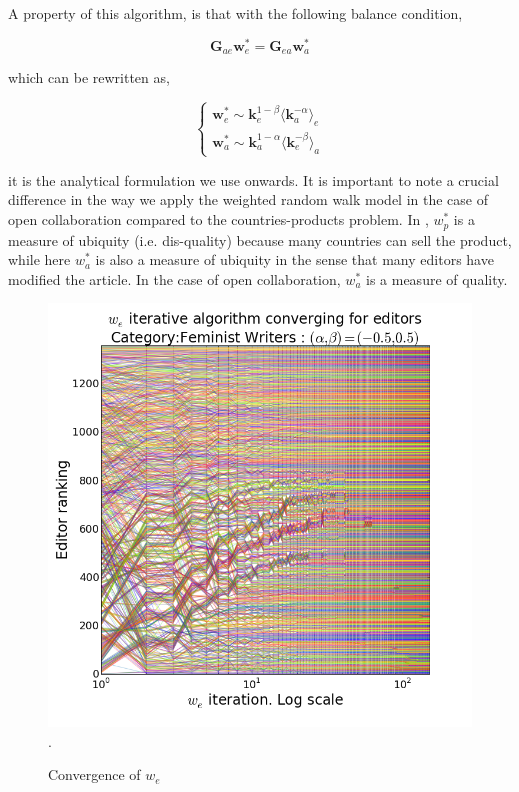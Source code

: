A property of this algorithm, is that with the following balance condition,

\begin{equation}
\mathbf{G}_{ae} \mathbf{w}^*_e = \mathbf{G}_{ea} \mathbf{w}^*_a
\end{equation}

which can be rewritten as,

\begin{equation}
\begin{cases}
\mathbf{w}^{*}_{e} \sim \mathbf{k}^{1-\beta}_{e} \langle \mathbf{k}_{a}^{-\alpha}\rangle_e \\
\mathbf{w}^{*}_{a} \sim \mathbf{k}^{1-\alpha}_{a} \langle \mathbf{k}_{e}^{-\beta}\rangle_a
\end{cases} \label{eqsim}
\end{equation}



it is the analytical formulation we use onwards. It is important to note a crucial difference in the way we apply the weighted random walk model in the case of open collaboration compared to the countries-products problem. In \cite{caldarelli2012network}, $w^*_p$ is a measure of ubiquity (i.e. dis-quality) because many countries can sell the product, while here $w^*_a$ is also a measure of ubiquity in the sense that many editors have modified the article. In the case of open collaboration, $w^*_a$ is a measure of quality.

\begin{figure}[!t]
\centering
\includegraphics[width=0.9\columnwidth]{Figures/fem_editors_iter_converge.png}.
\caption{Convergence of $w_e$}
\label{fig:convergence}
\end{figure}


